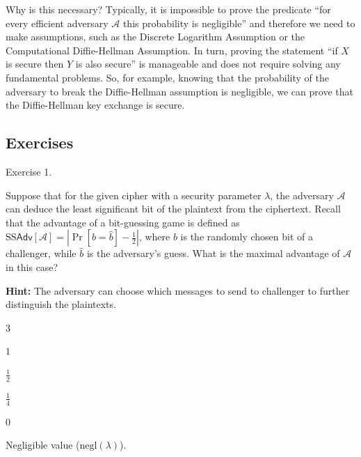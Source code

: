 \documentclass[../lecture-notes-148x210.tex]{subfiles}
\begin{document}
\vspace{10pt}

Why is this necessary? Typically, it is impossible to prove the predicate ``for every efficient adversary 
$\mathcal{A}$ this probability is negligible'' and therefore we need to make assumptions, such as the Discrete 
Logarithm Assumption or the Computational Diffie-Hellman Assumption. In turn, proving the statement ``if $X$ is 
secure then $Y$ is also secure'' is manageable and does not require solving any fundamental problems. So, for 
example, knowing that the probability of the adversary to break the Diffie-Hellman assumption is negligible, we 
can prove that the Diffie-Hellman key exchange is secure. 

\subsection{Exercises}

\begin{xexercise}
    {Exercise 1.}
    {
        Suppose that for the given cipher with a security parameter $\lambda$, the adversary $\mathcal{A}$ can 
        deduce the least significant bit of the plaintext from the ciphertext. Recall that the advantage of a 
        bit-guessing game is defined as $\text{SS}\mathsf{Adv}[\mathcal{A}] = \left|\Pr[b=\hat{b}] - \frac{1}{2}\right|$, 
        where $b$ is the randomly chosen bit of a challenger, while $\hat{b}$ is the adversary's guess. What is the 
        maximal advantage of $\mathcal{A}$ in this case?

        \textbf{Hint:} The adversary can choose which messages to send to challenger to further distinguish the plaintexts.
    }
    {3}
    {
        \item $1$
        \item $\frac{1}{2}$
        \item $\frac{1}{4}$
        \item $0$
        \item Negligible value ($\text{negl}(\lambda)$).
    }
\end{xexercise}
\end{document}
